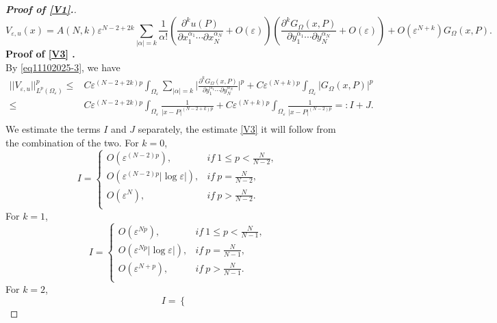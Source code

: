 \documentclass[10pt,a4paper]{amsart}
\renewcommand\O\Omega
\newcommand\e\varepsilon
\begin{document}
\begin{proof}[\bf Proof of \eqref{V1}.]
   \begin{equation}\label{eq11102025-3}
					V_{\e,u}(x)=A(N,k)\e^{N-2+2k}
					\sum_{|\alpha|=k}\frac1{\alpha!}
					\left(\frac{\partial^ku(P)}{\partial x_1^{\alpha_1}\cdots\partial x_N^{\alpha_N}}+O(\e)\right)
					\left(\frac{\partial^kG_{\Omega}(x,P)}{\partial y_1^{\alpha_1}\cdots\partial y_N^{\alpha_N}}+O(\e)\right)+O(\e^{N+k})G_{\Omega}(x,P).
				\end{equation}
				{\bf Proof of \eqref{V3} .}\\
                By \eqref{eq11102025-3}, we have
				\begin{equation}
                \begin{aligned}
					||V_{\e,u}||_{L^p(\O_\e)}^p\le& C\e^{(N-2+2k)p}\int_{\O_\e}\sum_{|\alpha|=k}\Big|\frac{\partial^kG_{\Omega}(x,P)}{\partial y_1^{\alpha_1}\cdots\partial y_N^{\alpha_N}}\Big|^p +C\e^{(N+k)p}
					\int_{\O_\e}|G_{\Omega}(x,P)|^p\\
                    \le & C\e^{(N-2+2k)p}\int_{\O_\e} \frac{1}{|x-P|^{(N-2+k)p}}+C\e^{(N+k)p}
					\int_{\O_\e}\frac1{|x-P|^{(N-2)p}}=:I+J.\\
                     \end{aligned}
				\end{equation}
				 We estimate the terms $I$ and $J$ separately, the estimate \eqref{V3} it will follow from the combination of the two. For $k=0$,
				\begin{equation}
					I=
					\begin{cases}
						O(\e^{(N-2)p}),  &if\ 1\le p<\frac N{N-2},\\
						O(\e^{(N-2)p}|\log\e|), &if\  p=\frac{N}{N-2},\\
						O(\e^{N}),   &if\  p>\frac{N}{N-2}.\\
					\end{cases}
				\end{equation}
				For $k=1$,
				\begin{equation}
					I=
					\begin{cases}
						O(\e^{Np}),  &if\ 1\le p<\frac N{N-1},\\
						O(\e^{Np}|\log\e|), &if\  p=\frac{N}{N-1},\\
						O(\e^{N+p}),   &if\  p>\frac{N}{N-1}.\\
					\end{cases}
				\end{equation}
				For $k= 2$,
				\begin{equation}
					I=
					\begin{cases}

\end{cases}
\end{equation}
\end{proof}
\end{document}
